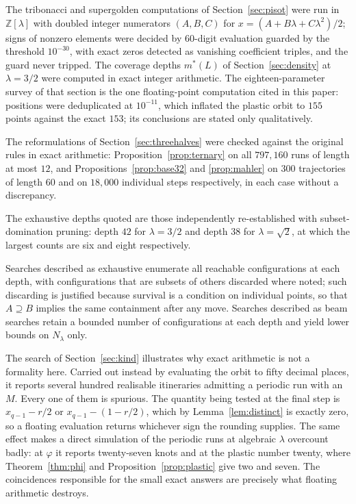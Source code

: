\documentclass[11pt,reqno]{amsart}
\theoremstyle{plain}
\theoremstyle{definition}
\theoremstyle{remark}
\newcommand{\Z}{\mathbb{Z}}
\begin{document}
The tribonacci and supergolden computations of Section~\ref{sec:pisot} were
run in $\Z[\lambda]$ with doubled integer numerators $(A,B,C)$ for
$x=(A+B\lambda+C\lambda^2)/2$; signs of nonzero elements were decided by
$60$-digit evaluation guarded by the threshold $10^{-30}$, with exact zeros
detected as vanishing coefficient triples, and the guard never tripped. The
coverage depths $m^*(L)$ of Section~\ref{sec:density} at $\lambda=3/2$ were
computed in exact integer arithmetic. The eighteen-parameter survey of that
section is the one floating-point computation cited in this paper: positions
were deduplicated at $10^{-11}$, which inflated the plastic orbit to $155$
points against the exact $153$; its conclusions are stated only qualitatively.

The reformulations of Section~\ref{sec:threehalves} were checked against the
original rules in exact arithmetic: Proposition~\ref{prop:ternary} on all
$797{,}160$ runs of length at most $12$, and Propositions~\ref{prop:base32} and
\ref{prop:mahler} on $300$ trajectories of length $60$ and on $18{,}000$
individual steps respectively, in each case without a discrepancy.

The exhaustive depths quoted are those independently re-established with
subset-domination pruning: depth $42$ for $\lambda=3/2$ and depth $38$ for
$\lambda=\sqrt2$, at which the largest counts are six and eight respectively.

Searches described as exhaustive enumerate all reachable configurations at each
depth, with configurations that are subsets of others discarded where noted;
such discarding is justified because survival is a condition on individual
points, so that $A\supseteq B$ implies the same containment after any move.
Searches described as beam searches retain a bounded number of configurations at
each depth and yield lower bounds on $N_\lambda$ only.

The search of Section~\ref{sec:kind} illustrates why exact arithmetic is not a
formality here. Carried out instead by evaluating the orbit to fifty decimal
places, it reports several hundred realisable itineraries admitting a periodic
run with an $M$. Every one of them is spurious. The quantity being tested at the
final step is $x_{q-1}-r/2$ or $x_{q-1}-(1-r/2)$, which by
Lemma~\ref{lem:distinct} is exactly zero, so a floating evaluation returns whichever
sign the rounding supplies. The same effect makes a direct simulation of the
periodic runs at algebraic $\lambda$ overcount badly: at $\varphi$ it reports
twenty-seven knots and at the plastic number twenty, where
Theorem~\ref{thm:phi} and Proposition~\ref{prop:plastic} give two and seven. The
coincidences responsible for the small exact answers are precisely what
floating arithmetic destroys.
\end{document}
